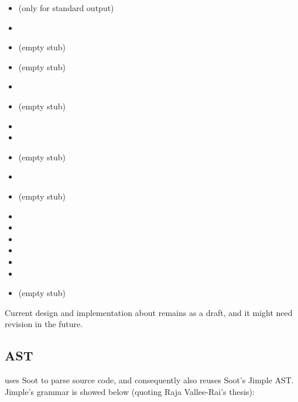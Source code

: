 \documentclass[12pt]{article}
\begin{document}
\begin{itemize}
\item {} (only for standard output)
\item {}
\item {} (empty stub)
\item {} (empty stub)
\item {}
\item {} (empty stub)
\item {}
\item {}
\item {} (empty stub)
\item {}
\item {} (empty stub)
\item {}
\item {}
\item {}
\item {}
\item {}
\item {}
\item {} (empty stub)
\end{itemize}

Current design and implementation about  
remains as a draft, and it might need revision in the future. 

\subsection{\rjcfull AST}

\rjc uses Soot to parse source code, and consequently also reuses
Soot's Jimple AST. Jimple's grammar is showed below (quoting
Raja Vallee-Rai's thesis):
\end{document}
